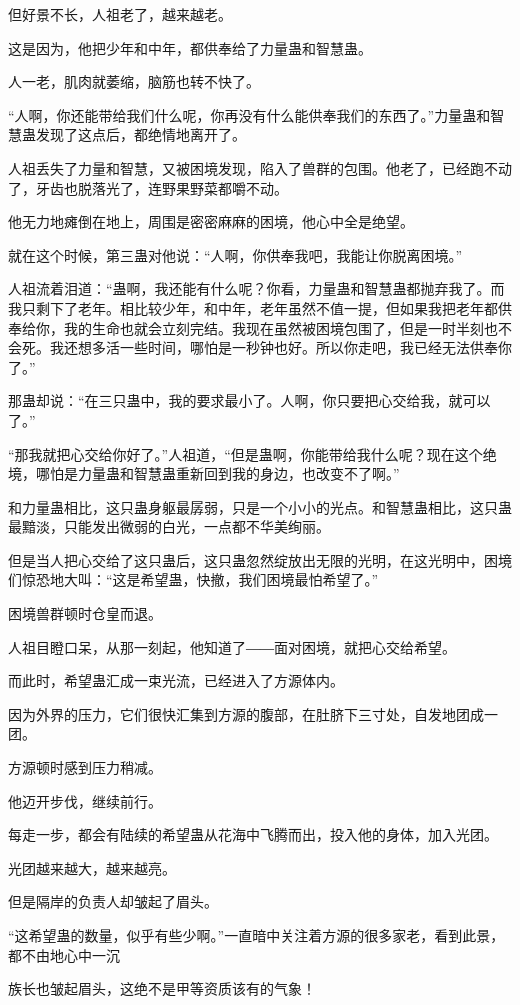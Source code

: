 \begin{this_body}
但好景不长，人祖老了，越来越老。

这是因为，他把少年和中年，都供奉给了力量蛊和智慧蛊。

人一老，肌肉就萎缩，脑筋也转不快了。

“人啊，你还能带给我们什么呢，你再没有什么能供奉我们的东西了。”力量蛊和智慧蛊发现了这点后，都绝情地离开了。

人祖丢失了力量和智慧，又被困境发现，陷入了兽群的包围。他老了，已经跑不动了，牙齿也脱落光了，连野果野菜都嚼不动。

他无力地瘫倒在地上，周围是密密麻麻的困境，他心中全是绝望。

就在这个时候，第三蛊对他说：“人啊，你供奉我吧，我能让你脱离困境。”

人祖流着泪道：“蛊啊，我还能有什么呢？你看，力量蛊和智慧蛊都抛弃我了。而我只剩下了老年。相比较少年，和中年，老年虽然不值一提，但如果我把老年都供奉给你，我的生命也就会立刻完结。我现在虽然被困境包围了，但是一时半刻也不会死。我还想多活一些时间，哪怕是一秒钟也好。所以你走吧，我已经无法供奉你了。”

那蛊却说：“在三只蛊中，我的要求最小了。人啊，你只要把心交给我，就可以了。”

“那我就把心交给你好了。”人祖道，“但是蛊啊，你能带给我什么呢？现在这个绝境，哪怕是力量蛊和智慧蛊重新回到我的身边，也改变不了啊。”

和力量蛊相比，这只蛊身躯最孱弱，只是一个小小的光点。和智慧蛊相比，这只蛊最黯淡，只能发出微弱的白光，一点都不华美绚丽。

但是当人把心交给了这只蛊后，这只蛊忽然绽放出无限的光明，在这光明中，困境们惊恐地大叫：“这是希望蛊，快撤，我们困境最怕希望了。”

困境兽群顿时仓皇而退。

人祖目瞪口呆，从那一刻起，他知道了――面对困境，就把心交给希望。

而此时，希望蛊汇成一束光流，已经进入了方源体内。

因为外界的压力，它们很快汇集到方源的腹部，在肚脐下三寸处，自发地团成一团。

方源顿时感到压力稍减。

他迈开步伐，继续前行。

每走一步，都会有陆续的希望蛊从花海中飞腾而出，投入他的身体，加入光团。

光团越来越大，越来越亮。

但是隔岸的负责人却皱起了眉头。

“这希望蛊的数量，似乎有些少啊。”一直暗中关注着方源的很多家老，看到此景，都不由地心中一沉

族长也皱起眉头，这绝不是甲等资质该有的气象！


\end{this_body}
